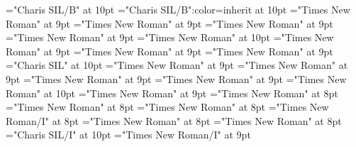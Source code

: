 \documentclass[gps1,twoside]{article}
\begin{document}
\font\spanbzhheadwordsubentrysubentriesentrysubentriesdiventryletData="Charis SIL/B" at 10pt
\font\aspanbzhheadwordsubentrysubentriesentrysubentriesdiventryletData="Charis SIL/B":color=inherit at 10pt
\font\spansubentrysubentriesentrysubentriesdiventryletData="Times New Roman" at 9pt
\font\complexformtypessubentrysubentriesentryaftersubentrysubentriesentrysubentriesdiventryletData="Times New Roman" at 9pt
\font\complexformtypespansubentrysubentriesentrysubentriesdiventryletData="Times New Roman" at 9pt
\font\spancomplexformtypespansubentrysubentriesentrysubentriesdiventryletData="Times New Roman" at 9pt
\font\spanenspancomplexformtypespansubentrysubentriesentrysubentriesdiventryletData="Times New Roman" at 10pt
\font\pronunciationssubentrysubentriesentryaftersubentrysubentriesentrysubentriesdiventryletData="Times New Roman" at 9pt
\font\pronunciationspansubentrysubentriesentrysubentriesdiventryletData="Times New Roman" at 9pt
\font\spanpronunciationspansubentrysubentriesentrysubentriesdiventryletData="Times New Roman" at 9pt
\font\spanbzhfonipaspanpronunciationspansubentrysubentriesentrysubentriesdiventryletData="Charis SIL" at 10pt
\font\sensessubentrysubentriesentryaftersubentrysubentriesentrysubentriesdiventryletData="Times New Roman" at 9pt
\font\spanspansubentrysubentriesentrysubentriesdiventryletData="Times New Roman" at 9pt
\font\sensespanspansubentrysubentriesentrysubentriesdiventryletData="Times New Roman" at 9pt
\font\spansensespanspansubentrysubentriesentrysubentriesdiventryletData="Times New Roman" at 9pt
\font\spanenspansensespanspansubentrysubentriesentrysubentriesdiventryletData="Times New Roman" at 10pt
\font\examplessensesensessubentrysubentriesentryaftersensespanspansubentrysubentriesentrysubentriesdiventryletData="Times New Roman" at 9pt
\font\examplespansensespanspansubentrysubentriesentrysubentriesdiventryletData="Times New Roman" at 8pt
\font\examplebeforespansensespanspansubentrysubentriesentrysubentriesdiventryletData="Times New Roman" at 8pt
\font\exampleafterspansensespanspansubentrysubentriesentrysubentriesdiventryletData="Times New Roman" at 8pt
\font\exampleexamplespansensespanspansubentrysubentriesentrysubentriesdiventryletData="Times New Roman/I" at 8pt
\font\examplebeforeexamplespansensespanspansubentrysubentriesentrysubentriesdiventryletData="Times New Roman" at 8pt
\font\exampleafterexamplespansensespanspansubentrysubentriesentrysubentriesdiventryletData="Times New Roman" at 8pt
\font\spanbzhexampleexamplespansensespanspansubentrysubentriesentrysubentriesdiventryletData="Charis SIL/I" at 10pt
\font\spanexampleexampleexamplessensesensessensesensessubentrysubentriesentryexamplespansensespanspansubentrysubentriesentrysubentriesdiventryletData="Times New Roman/I" at 9pt
\end{document}
